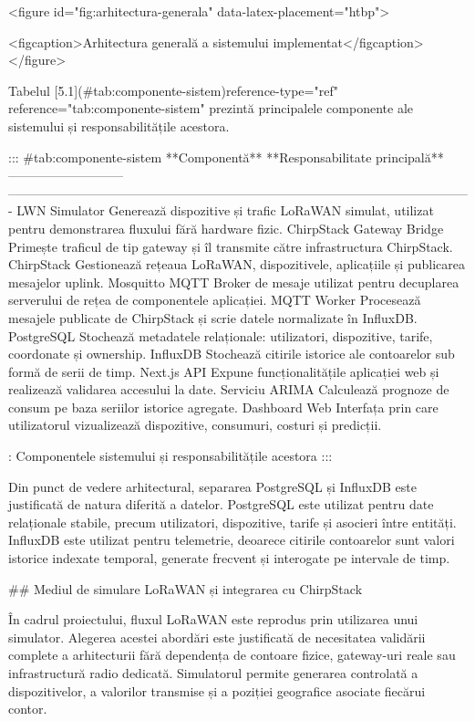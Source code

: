 <figure id="fig:arhitectura-generala" data-latex-placement="htbp">

<figcaption>Arhitectura generală a sistemului implementat</figcaption>
</figure>

Tabelul [5.1](#tab:componente-sistem){reference-type="ref"
reference="tab:componente-sistem"} prezintă principalele componente ale
sistemului și responsabilitățile acestora.

::: {#tab:componente-sistem}
  **Componentă**              **Responsabilitate principală**
  --------------------------- -------------------------------------------------------------------------------------------------------------
  LWN Simulator               Generează dispozitive și trafic LoRaWAN simulat, utilizat pentru demonstrarea fluxului fără hardware fizic.
  ChirpStack Gateway Bridge   Primește traficul de tip gateway și îl transmite către infrastructura ChirpStack.
  ChirpStack                  Gestionează rețeaua LoRaWAN, dispozitivele, aplicațiile și publicarea mesajelor uplink.
  Mosquitto MQTT              Broker de mesaje utilizat pentru decuplarea serverului de rețea de componentele aplicației.
  MQTT Worker                 Procesează mesajele publicate de ChirpStack și scrie datele normalizate în InfluxDB.
  PostgreSQL                  Stochează metadatele relaționale: utilizatori, dispozitive, tarife, coordonate și ownership.
  InfluxDB                    Stochează citirile istorice ale contoarelor sub formă de serii de timp.
  Next.js API                 Expune funcționalitățile aplicației web și realizează validarea accesului la date.
  Serviciu ARIMA              Calculează prognoze de consum pe baza seriilor istorice agregate.
  Dashboard Web               Interfața prin care utilizatorul vizualizează dispozitive, consumuri, costuri și predicții.

  : Componentele sistemului și responsabilitățile acestora
:::

Din punct de vedere arhitectural, separarea PostgreSQL și InfluxDB este
justificată de natura diferită a datelor. PostgreSQL este utilizat
pentru date relaționale stabile, precum utilizatori, dispozitive, tarife
și asocieri între entități. InfluxDB este utilizat pentru telemetrie,
deoarece citirile contoarelor sunt valori istorice indexate temporal,
generate frecvent și interogate pe intervale de timp.

## Mediul de simulare LoRaWAN și integrarea cu ChirpStack

În cadrul proiectului, fluxul LoRaWAN este reprodus prin utilizarea unui
simulator. Alegerea acestei abordări este justificată de necesitatea
validării complete a arhitecturii fără dependența de contoare fizice,
gateway-uri reale sau infrastructură radio dedicată. Simulatorul permite
generarea controlată a dispozitivelor, a valorilor transmise și a
poziției geografice asociate fiecărui contor.


